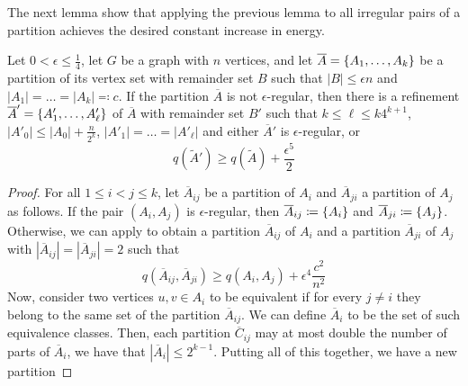         The next lemma show that applying the previous lemma to all irregular pairs of a partition achieves the desired
        constant increase in energy.

        \begin{lemma} \label{lem:increase_in_energy_when_refining_an_irregular_partition}
            Let $0 < \epsilon \leq \frac{1}{4}$, let $G$ be a graph with $n$ vertices, and let
            $\overline{A} = \{ A_1, \dots, A_k \}$ be a partition of its vertex set with remainder set $B$ such that
            $|B| \leq \epsilon n$ and $|A_1| = \dots = |A_k| \eqqcolon c$.
            If the partition $\overline{A}$ is not $\epsilon$-regular, then there is a refinement
            $\overline{A}' = \{ A'_1, \dots, A'_\ell \}$ of $\overline{A}$ with remainder set $B'$ such that
            $k \leq \ell \leq k 4^{k+1}$, $|A'_0| \leq |A_0| + \frac{n}{2^k}$, $|A'_1| = \dots = |A'_\ell|$ and
            either $\overline{A}'$ is $\epsilon$-regular, or
            \[
                q(\widetilde{A}') \geq q(\widetilde{A}) + \frac{\epsilon^5}{2}
            \]
            \begin{proof}
                For all $1 \leq i < j \leq k$, let $\overline{A}_{ij}$ be a partition of $A_i$ and $\overline{A}_{ji}$ a
                partition of $A_j$ as follows.
                If the pair $(A_i, A_j)$ is $\epsilon$-regular, then $\overline{A}_{ij} \coloneqq \{ A_i \}$ and
                $\overline{A}_{ji} \coloneqq \{ A_j \}$.
                Otherwise, we can apply  to obtain a
                partition $\overline{A}_{ij}$ of $A_i$ and a partition $\overline{A}_{ji}$ of $A_j$ with
                $|\overline{A}_{ij}| = |\overline{A}_{ji}| = 2$ such that
                \begin{equation} \label{eq:increase_in_energy_in_refined_ij_pair}
                    q(\overline{A}_{ij}, \overline{A}_{ji}) \geq q(A_i, A_j) + \epsilon^4 \frac{c^2}{n^2}
                \end{equation}
                Now, consider two vertices $u, v \in A_i$ to be equivalent if for every $j \neq i$ they belong to the
                same set of the partition $\overline{A}_{ij}$.
                We can define $\overline{A}_i$ to be the set of such equivalence classes.
                Then, each partition $\overline{C}_{ij}$ may at most double the number of parts of $\overline{A}_i$,
                we have that $|\overline{A}_i| \leq 2^{k-1}$.
                Putting all of this together, we have a new partition

\end{proof}
\end{lemma}
